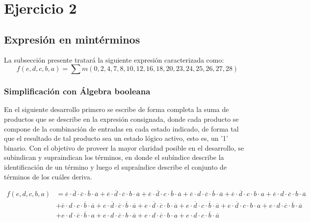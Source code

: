 \section{Ejercicio 2}

\subsection{Expresi\'on en mint\'erminos}
La subsecci\'on presente tratar\'a la siguiente expresi\'on caracterizada como:
\begin{equation*}
    f(e,d,c,b,a) = \sum m(0,2,4,7,8,10,12,16,18,20,23,24,25,26,27,28)
\end{equation*}


\subsubsection{Simplificación con Álgebra booleana}
En el siguiente desarrollo primero se escribe de forma completa la suma de productos que se describe en la expresi\'on
consignada, donde cada producto se compone de la combinaci\'on de entradas en cada estado indicado, de forma tal que el resultado 
de tal producto sea un estado l\'ogico activo, esto es, un '1' binario. Con el objetivo de proveer la mayor claridad posible en el desarrollo,
se subindican y supraindican los t\'erminos, en donde el sub\'indice describe la identificaci\'on de un t\'ermino y luego el supra\'indice describe
el conjunto de t\'erminos de los cu\'ales deriva.

\begin{equation*}
\begin{align*}
f(e,d,c,b,a) & = {\overline{e} \cdot \overline{d} \cdot \overline{c} \cdot \overline{b} \cdot \overline{a}}
+ {\overline{e} \cdot \overline{d} \cdot \overline{c} \cdot b \cdot \overline{a}} 
+ {\overline{e} \cdot \overline{d}  \cdot c \cdot \overline{b} \cdot \overline{a}}  
+ {\overline{e} \cdot d \cdot \overline{c} \cdot \overline{b} \cdot \overline{a}} 
+ {\overline{e} \cdot \overline{d} \cdot c \cdot b \cdot a}
+ {\overline{e} \cdot d \cdot \overline{c} \cdot b \cdot \overline{a}}  \\
& + {\overline{e} \cdot d \cdot c \cdot \overline{b} \cdot \overline{a}}
+ {e \cdot \overline{d} \cdot \overline{c} \cdot \overline{b} \cdot \overline{a}} 
+ {e \cdot \overline{d} \cdot \overline{c} \cdot b \cdot \overline{a}}
+ {e \cdot \overline{d} \cdot c \cdot \overline{b} \cdot \overline{a}}
+ {e \cdot \overline{d} \cdot c \cdot b \cdot a}
+ {e \cdot d \cdot \overline{c} \cdot \overline{b} \cdot \overline{a}} \\
& + {e \cdot d \cdot \overline{c} \cdot \overline{b} \cdot a} 
+ {e \cdot d \cdot \overline{c} \cdot b \cdot \overline{a}} 
+ {e \cdot d \cdot \overline{c} \cdot b \cdot a}
+ {e \cdot d \cdot c \cdot \overline{b} \cdot \overline{a}}
\end{align*}
\end{equation*}

